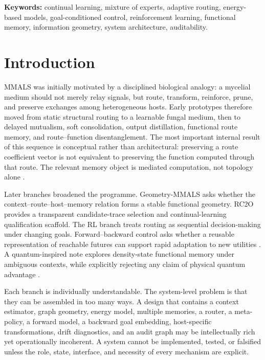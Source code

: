 \documentclass[10pt]{article}
\begin{document}
\noindent\textbf{Keywords:} continual learning, mixture of experts, adaptive routing, energy-based models, goal-conditioned control, reinforcement learning, functional memory, information geometry, system architecture, auditability.

\tableofcontents
\newpage

\section{Introduction}

MMALS was initially motivated by a disciplined biological analogy: a mycelial medium should not merely relay signals, but route, transform, reinforce, prune, and preserve exchanges among heterogeneous hosts. Early prototypes therefore moved from static structural routing to a learnable fungal medium, then to delayed mutualism, soft consolidation, output distillation, functional route memory, and route--function disentanglement. The most important internal result of this sequence is conceptual rather than architectural: preserving a route coefficient vector is not equivalent to preserving the function computed through that route. The relevant memory object is mediated computation, not topology alone \citep{mmalsv09}.

Later branches broadened the programme. Geometry-MMALS asks whether the context--route--host--memory relation forms a stable functional geometry. RC2O provides a transparent candidate-trace selection and continual-learning qualification scaffold. The RL branch treats routing as sequential decision-making under changing goals. Forward--backward control asks whether a reusable representation of reachable futures can support rapid adaptation to new utilities \citep{touati2021learning,touati2022zeroshot}. A quantum-inspired note explores density-state functional memory under ambiguous contexts, while explicitly rejecting any claim of physical quantum advantage \citep{mmalsqi}.

Each branch is individually understandable. The system-level problem is that they can be assembled in too many ways. A design that contains a context estimator, graph geometry, energy model, multiple memories, a router, a meta-policy, a forward model, a backward goal embedding, host-specific transformations, drift diagnostics, and an audit graph may be intellectually rich yet operationally incoherent. A system cannot be implemented, tested, or falsified unless the role, state, interface, and necessity of every mechanism are explicit.
\end{document}
